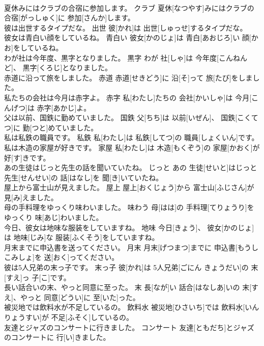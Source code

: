 \documentclass[8pt]{extreport}
\begin{document}
\begin{CJK}{UTF8}{min}
\\	夏休みにはクラブの合宿に参加します。	クラブ	夏休[なつやす]みにはクラブの 合宿[がっしゅく]に 参加[さんか]します。	
\\	彼は出世するタイプだな。	出世	彼[かれ]は 出世[しゅっせ]するタイプだな。	
\\	彼女は青白い顔をしているね。	青白い	彼女[かのじょ]は 青白[あおじろ]い 顔[かお]をしているね。	
\\	わが社は今年度、黒字となりました。	黒字	わが 社[しゃ]は 今年度[こんねんど]、 黒字[くろじ]となりました。	
\\	赤道に沿って旅をしました。	赤道	赤道[せきどう]に 沿[そ]って 旅[たび]をしました。	
\\	私たちの会社は今月は赤字よ。	赤字	私[わたし]たちの 会社[かいしゃ]は 今月[こんげつ]は 赤字[あかじ]よ。	
\\	父は以前、国鉄に勤めていました。	国鉄	父[ちち]は 以前[いぜん]、 国鉄[こくてつ]に 勤[つと]めていました。	
\\	私は私鉄の職員です。	私鉄	私[わたし]は 私鉄[してつ]の 職員[しょくいん]です。	
\\	私は木造の家屋が好きです。	家屋	私[わたし]は 木造[もくぞう]の 家屋[かおく]が 好[す]きです。	
\\	あの生徒はじっと先生の話を聞いていたね。	じっと	あの 生徒[せいと]はじっと 先生[せんせい]の 話[はなし]を 聞[き]いていたね。	
\\	屋上から富士山が見えました。	屋上	屋上[おくじょう]から 富士山[ふじさん]が 見[み]えました。	
\\	母の手料理をゆっくり味わいました。	味わう	母[はは]の 手料理[てりょうり]をゆっくり 味[あじ]わいました。	
\\	今日、彼女は地味な服装をしていますね。	地味	今日[きょう]、 彼女[かのじょ]は 地味[じみ]な 服装[ふくそう]をしていますね。	
\\	月末までに申込書を送ってください。	月末	月末[げつまつ]までに 申込書[もうしこみしょ]を 送[おく]ってください。	
\\	彼は5人兄弟の末っ子です。	末っ子	彼[かれ]は 5人兄弟[ごにん きょうだい]の 末[すえ]っ 子[こ]です。	
\\	長い話合いの末、やっと同意に至った。	末	長[なが]い 話合[はなしあ]いの 末[すえ]、やっと 同意[どうい]に 至[いた]った。	
\\	被災地では飲料水が不足しているの。	飲料水	被災地[ひさいち]では 飲料水[いんりょうすい]が 不足[ふそく]しているの。	
\\	友達とジャズのコンサートに行きました。	コンサート	友達[ともだち]とジャズのコンサートに 行[い]きました。	

\end{CJK}
\end{document}
